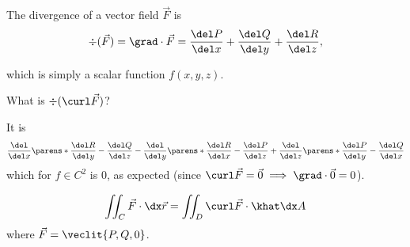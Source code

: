 \documentclass{article}
\begin{document}
\begin{defn}[Divergence]
  The divergence of a vector field $\vec{F}$ is
  \[ \div(\vec{F}) = \grad \cdot \vec{F} = \frac{\del P}{\del x} + \frac{\del Q}{\del y} + \frac{\del R}{\del z}, \]
\end{defn}
which is simply a scalar function $f(x, y, z)$.

\begin{ex}
  What is $\div(\curl \vec{F})$?

  It is
  \[
    \frac{\del}{\del x}\parens*{\frac{\del R}{\del y} - \frac{\del Q}{\del z}}
    - \frac{\del}{\del y}\parens*{\frac{\del R}{\del x} - \frac{\del P}{\del z}}
    + \frac{\del}{\del z}\parens*{\frac{\del P}{\del y} - \frac{\del Q}{\del x}}
  \]
  which for $f \in C^{2}$ is 0, as expected (since $\curl \vec{F} = \vec{0} \implies \grad \cdot \vec{0} = 0$).
\end{ex}

\begin{theorem}
  \[
    \iint_{C} \vec{F} \cdot \dx\vec{r} = \iint_{D} \curl \vec{F} \cdot \khat \dx A
  \]
  where $\vec{F} = \veclit{P, Q, 0}$.
\end{theorem}
\end{document}
